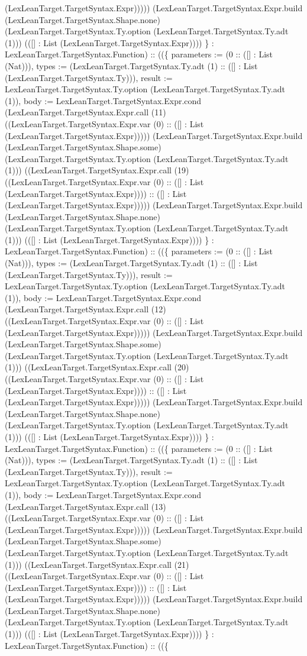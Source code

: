 \documentclass[11pt]{article}
\begin{document}
(LexLeanTarget.TargetSyntax.Expr))))) (LexLeanTarget.TargetSyntax.Expr.build (LexLeanTarget.TargetSyntax.Shape.none) (LexLeanTarget.TargetSyntax.Ty.option (LexLeanTarget.TargetSyntax.Ty.adt (1))) (([] : List (LexLeanTarget.TargetSyntax.Expr)))) \} : LexLeanTarget.TargetSyntax.Function) :: ((\{ parameters := (0 :: ([] : List (Nat))), types := (LexLeanTarget.TargetSyntax.Ty.adt (1) :: ([] : List (LexLeanTarget.TargetSyntax.Ty))), result := LexLeanTarget.TargetSyntax.Ty.option (LexLeanTarget.TargetSyntax.Ty.adt (1)), body := LexLeanTarget.TargetSyntax.Expr.cond (LexLeanTarget.TargetSyntax.Expr.call (11) ((LexLeanTarget.TargetSyntax.Expr.var (0) :: ([] : List (LexLeanTarget.TargetSyntax.Expr))))) (LexLeanTarget.TargetSyntax.Expr.build (LexLeanTarget.TargetSyntax.Shape.some) (LexLeanTarget.TargetSyntax.Ty.option (LexLeanTarget.TargetSyntax.Ty.adt (1))) ((LexLeanTarget.TargetSyntax.Expr.call (19) ((LexLeanTarget.TargetSyntax.Expr.var (0) :: ([] : List (LexLeanTarget.TargetSyntax.Expr)))) :: ([] : List (LexLeanTarget.TargetSyntax.Expr))))) (LexLeanTarget.TargetSyntax.Expr.build (LexLeanTarget.TargetSyntax.Shape.none) (LexLeanTarget.TargetSyntax.Ty.option (LexLeanTarget.TargetSyntax.Ty.adt (1))) (([] : List (LexLeanTarget.TargetSyntax.Expr)))) \} : LexLeanTarget.TargetSyntax.Function) :: ((\{ parameters := (0 :: ([] : List (Nat))), types := (LexLeanTarget.TargetSyntax.Ty.adt (1) :: ([] : List (LexLeanTarget.TargetSyntax.Ty))), result := LexLeanTarget.TargetSyntax.Ty.option (LexLeanTarget.TargetSyntax.Ty.adt (1)), body := LexLeanTarget.TargetSyntax.Expr.cond (LexLeanTarget.TargetSyntax.Expr.call (12) ((LexLeanTarget.TargetSyntax.Expr.var (0) :: ([] : List (LexLeanTarget.TargetSyntax.Expr))))) (LexLeanTarget.TargetSyntax.Expr.build (LexLeanTarget.TargetSyntax.Shape.some) (LexLeanTarget.TargetSyntax.Ty.option (LexLeanTarget.TargetSyntax.Ty.adt (1))) ((LexLeanTarget.TargetSyntax.Expr.call (20) ((LexLeanTarget.TargetSyntax.Expr.var (0) :: ([] : List (LexLeanTarget.TargetSyntax.Expr)))) :: ([] : List (LexLeanTarget.TargetSyntax.Expr))))) (LexLeanTarget.TargetSyntax.Expr.build (LexLeanTarget.TargetSyntax.Shape.none) (LexLeanTarget.TargetSyntax.Ty.option (LexLeanTarget.TargetSyntax.Ty.adt (1))) (([] : List (LexLeanTarget.TargetSyntax.Expr)))) \} : LexLeanTarget.TargetSyntax.Function) :: ((\{ parameters := (0 :: ([] : List (Nat))), types := (LexLeanTarget.TargetSyntax.Ty.adt (1) :: ([] : List (LexLeanTarget.TargetSyntax.Ty))), result := LexLeanTarget.TargetSyntax.Ty.option (LexLeanTarget.TargetSyntax.Ty.adt (1)), body := LexLeanTarget.TargetSyntax.Expr.cond (LexLeanTarget.TargetSyntax.Expr.call (13) ((LexLeanTarget.TargetSyntax.Expr.var (0) :: ([] : List (LexLeanTarget.TargetSyntax.Expr))))) (LexLeanTarget.TargetSyntax.Expr.build (LexLeanTarget.TargetSyntax.Shape.some) (LexLeanTarget.TargetSyntax.Ty.option (LexLeanTarget.TargetSyntax.Ty.adt (1))) ((LexLeanTarget.TargetSyntax.Expr.call (21) ((LexLeanTarget.TargetSyntax.Expr.var (0) :: ([] : List (LexLeanTarget.TargetSyntax.Expr)))) :: ([] : List (LexLeanTarget.TargetSyntax.Expr))))) (LexLeanTarget.TargetSyntax.Expr.build (LexLeanTarget.TargetSyntax.Shape.none) (LexLeanTarget.TargetSyntax.Ty.option (LexLeanTarget.TargetSyntax.Ty.adt (1))) (([] : List (LexLeanTarget.TargetSyntax.Expr)))) \} : LexLeanTarget.TargetSyntax.Function) :: ((\{ 
\end{document}
